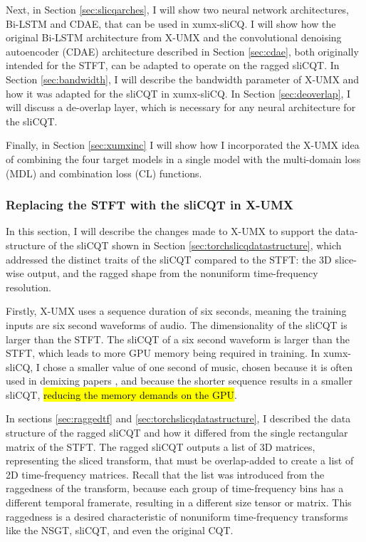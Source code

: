 \documentclass[report.tex]{subfiles}
\begin{document}
Next, in Section \ref{sec:slicqarches}, I will show two neural network architectures, Bi-LSTM and CDAE, that can be used in xumx-sliCQ. I will show how the original Bi-LSTM architecture from X-UMX and the convolutional denoising autoencoder (CDAE) architecture described in Section \ref{sec:cdae}, both originally intended for the STFT, can be adapted to operate on the ragged sliCQT. In Section \ref{sec:bandwidth}, I will describe the bandwidth parameter of X-UMX and how it was adapted for the sliCQT in xumx-sliCQ. In Section \ref{sec:deoverlap}, I will discuss a de-overlap layer, which is necessary for any neural architecture for the sliCQT.

Finally, in Section \ref{sec:xumxinc} I will show how I incorporated the X-UMX idea of combining the four target models in a single model with the multi-domain loss (MDL) and combination loss (CL) functions.

\subsubsection{Replacing the STFT with the sliCQT in X-UMX}
\label{sec:replacestft}

In this section, I will describe the changes made to X-UMX to support the data-structure of the sliCQT shown in Section \ref{sec:torchslicqdatastructure}, which addressed the distinct traits of the sliCQT compared to the STFT: the 3D slice-wise output, and the ragged shape from the nonuniform time-frequency resolution.

Firstly, X-UMX uses a sequence duration of six seconds, meaning the training inputs are six second waveforms of audio. The dimensionality of the sliCQT is larger than the STFT. The sliCQT of a six second waveform is larger than the STFT, which leads to more GPU memory being required in training. In xumx-sliCQ, I chose a smaller value of one second of music, chosen because it is often used in demixing papers \parencite{plumbley1, plumbley2, demucs}, and because the shorter sequence results in a smaller sliCQT, \hl{reducing the memory demands on the GPU}.

In sections \ref{sec:raggedtf} and \ref{sec:torchslicqdatastructure}, I described the data structure of the ragged sliCQT and how it differed from the single rectangular matrix of the STFT. The ragged sliCQT outputs a list of 3D matrices, representing the sliced transform, that must be overlap-added to create a list of 2D time-frequency matrices. Recall that the list was introduced from the raggedness of the transform, because each group of time-frequency bins has a different temporal framerate, resulting in a different size tensor or matrix. This raggedness is a desired characteristic of nonuniform time-frequency transforms like the NSGT, sliCQT, and even the original CQT.
\end{document}

